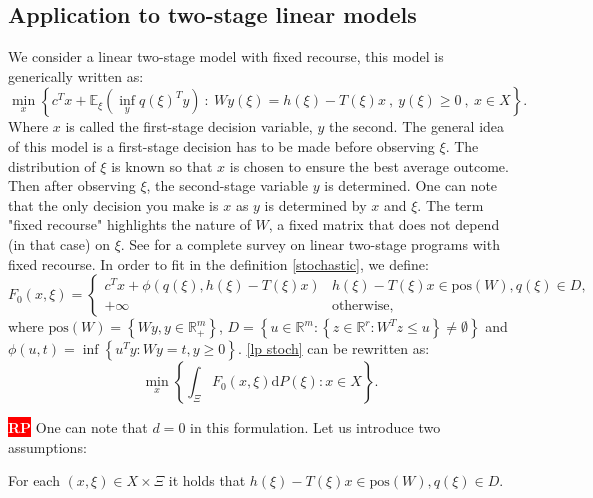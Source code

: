 \documentclass{amsart}
\newcommand{\nb}[3]{
		{\colorbox{#2}{\bfseries\sffamily\tiny\textcolor{white}{#1}}}
		{\textcolor{#2}{\text{$\blacktriangleright$}{\textcolor{#2}{#3}}\text{$\blacktriangleleft$}}}}
\newcommand{\rp}[1]{\nb{RP}{red}{#1}}
\newcommand{\RR}{\mathbb{R}}
\begin{document}
\subsection{Application to two-stage linear models}\label{two stage}
We consider a linear two-stage model with fixed recourse, this model is generically written as: 
\begin{equation}\label{lp stoch}
    \min_x\left\{c^Tx + \mathbb{E}_\xi\left(\inf_y q\left(\xi\right)^Ty \right)\: :\: Wy\left(\xi\right)=h\left(\xi\right)-T\left(\xi\right)x\:,\: y\left(\xi\right)\geq0\:,\: x\in X \right\}.
\end{equation}
Where $x$ is called the first-stage decision variable, $y$ the second. The general idea of this model is a first-stage decision has to be made before observing $\xi$. The distribution of $\xi$ is known so that $x$ is chosen to ensure the best average outcome. Then after observing $\xi$, the second-stage variable $y$ is determined. One can note that the only decision you make is $x$ as $y$ is determined by $x$ and $\xi$. The term "fixed recourse" highlights the nature of $W$, a fixed matrix that does not depend (in that case) on $\xi$. See \cite{wets_stochastic_1974} for a complete survey on linear two-stage programs with fixed recourse. In order to fit in the definition  \ref{stochastic}, we define:
$$
F_0\left(x,\xi\right)=\begin{cases} 
  c^Tx + \phi\left(q\left(\xi\right), h\left(\xi\right) -T\left(\xi\right)x\right) & h\left(\xi\right)-     T\left(\xi\right)x \in \text{pos}\left(W\right), q\left(\xi\right) \in D, \\
  +\infty & \text{otherwise},
\end{cases}
$$
where $\text{pos}(W)=\left\{Wy, y\in\RR_+^m\right\}$, $D=\left\{u\in\RR^m:\left\{z\in\RR^r:W^Tz \leq u\right\}\ne \emptyset\right\}$ and  \\$\phi\left(u,t\right)=\inf\left\{ u^Ty : Wy=t, y\geq0\right\}$. \ref{lp stoch} can be rewritten as:
\begin{equation}\label{rewrite}
    \min_x\left\{\int_\Xi F_0\left(x,\xi\right)\text{d}P\left(\xi\right): x\in X\right\}. 
\end{equation}
\rp{i will write down a proof later as it does not appear on the article}
One can note that $d=0$ in this formulation. Let us introduce two assumptions: 
\begin{assumption}\label{h1} For each $\left(x,\xi\right)\in X\times \Xi$ it holds that $h\left(\xi\right)- T\left(\xi\right)x\in \text{pos}\left(W\right), q\left(\xi\right) \in D$.
\end{assumption}
\end{document}
